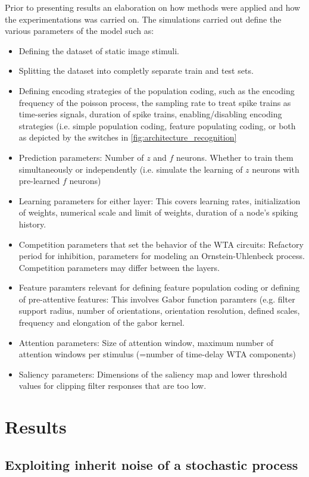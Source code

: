 \documentclass{report}
\begin{document}
Prior to presenting results an elaboration on how methods were applied and how the experimentations was carried on. The simulations carried out define the various parameters of the model such as:
\begin{itemize}
  \item Defining the dataset of static image stimuli.
  \item Splitting the dataset into completly separate train and test sets.
  \item Defining encoding strategies of the population coding, such as the encoding frequency of the poisson process, the sampling rate to treat spike trains as time-series signals, duration of spike trains, enabling/disabling encoding strategies (i.e. simple population coding, feature populating coding, or both as depicted by the switches in \cref{fig:architecture_recognition} 
  \item Prediction parameters: Number of $z$ and $f$ neurons. Whether to train them simultaneously or independently (i.e. simulate the learning of $z$ neurons with pre-learned $f$ neurons)
  \item Learning parameters for either layer: This covers learning rates, initialization of weights, numerical scale and limit of weights, duration of a node's spiking history.
  \item Competition parameters that set the behavior of the WTA circuits: Refactory period for inhibition, parameters for modeling an Ornstein-Uhlenbeck process. Competition parameters may differ between the layers.
  \item Feature paramters relevant for defining feature population coding or defining of pre-attentive features: This involves Gabor function paramters (e.g. filter support radius, number of orientations, orientation resolution, defined scales, frequency and elongation of the gabor kernel.
  \item Attention parameters: Size of attention window, maximum number of attention windows per stimulus (=number of time-delay WTA components)
  \item Saliency parameters: Dimensions of the saliency map and lower threshold values for clipping filter responses that are too low.
  \end{itemize}

\chapter{Results}

\section{Exploiting inherit noise of a stochastic process}
\end{document}
